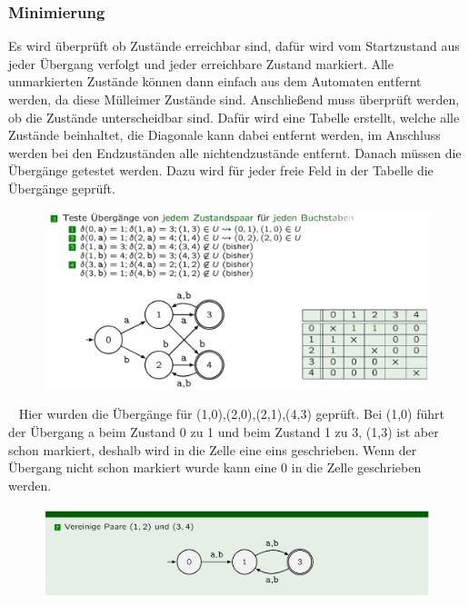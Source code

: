 \documentclass[12pt,a4paper]{article}
\begin{document}
\subsubsection{Minimierung}

Es wird überprüft ob Zustände erreichbar sind, dafür wird vom Startzustand aus jeder Übergang verfolgt und jeder erreichbare Zustand markiert. Alle unmarkierten Zustände können dann einfach aus dem Automaten entfernt werden, da diese Mülleimer Zustände sind.
Anschließend muss überprüft werden, ob die Zustände unterscheidbar sind.
Dafür wird eine Tabelle erstellt, welche alle Zustände beinhaltet, die Diagonale kann dabei entfernt werden, im Anschluss werden bei den Endzuständen alle nichtendzustände entfernt.
Danach müssen die Übergänge getestet werden. Dazu wird für jeder freie Feld in der Tabelle die Übergänge geprüft.
\newline
\begin{center}
	\begin{figure}[!h]
		\includegraphics[width=\textwidth]{Bilder/MinimizingUbergangBsp.png}
	\end{figure}
\end{center}
~\newline
Hier wurden die Übergänge für (1,0),(2,0),(2,1),(4,3) geprüft. Bei (1,0) führt der Übergang a beim Zustand 0 zu 1 und beim Zustand 1 zu 3, (1,3) ist aber schon markiert, deshalb wird in die Zelle eine eins geschrieben. Wenn der Übergang nicht schon markiert wurde kann eine 0 in die Zelle geschrieben werden. 
\newline
\begin{center}
	\begin{figure}[!h]
		\includegraphics[width=\textwidth]{Bilder/MinimizingVereinigung.png}
	\end{figure}
\end{center}
\end{document}
